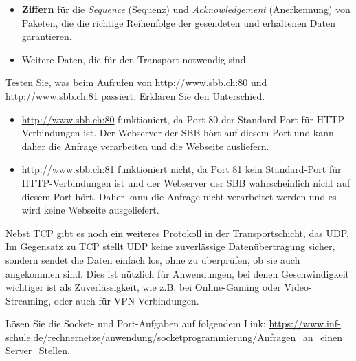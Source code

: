 \begin{itemize}
\begin{table}[H]
		      \caption{Gängige Ports, Anwendungen und deren Verwendung (\gls{DNS} verwendet hauptsächlich \gls{UDP}, die übrigen Anwendungen \gls{TCP})}
		      \label{tab:tcpPorts}
	      \end{table}
	      Sowohl der \textit{Client} wie auch der \textit{Server} versehen die Daten mit jeweils einer Zahl, die für den Ursprungs-Port (\textit{Source Port}), respektive den Ziel-Port (\textit{Destination Port}) stehen.
	\item \textbf{Ziffern} für die \textit{Sequence} (Sequenz) und \textit{Acknowledgement} (Anerkennung) von Paketen, die die richtige Reihenfolge der gesendeten und erhaltenen Daten garantieren.
	\item Weitere Daten, die für den Transport notwendig sind.
\end{itemize}

\begin{myexercise}
	Testen Sie, was beim Aufrufen von \url{http://www.sbb.ch:80} und \url{http://www.sbb.ch:81} passiert. Erklären Sie den Unterschied.
	\begin{myanswer}
		\begin{itemize}
			\item \url{http://www.sbb.ch:80} funktioniert, da Port 80 der Standard-Port für \gls{HTTP}-Verbindungen ist. Der Webserver der SBB hört auf diesem Port und kann daher die Anfrage verarbeiten und die Webseite ausliefern.
			\item \url{http://www.sbb.ch:81} funktioniert nicht, da Port 81 kein Standard-Port für \gls{HTTP}-Verbindungen ist und der Webserver der SBB wahrscheinlich nicht auf diesem Port hört. Daher kann die Anfrage nicht verarbeitet werden und es wird keine Webseite ausgeliefert.
		\end{itemize}
	\end{myanswer}
\end{myexercise}

Nebst \gls{TCP} gibt es noch ein weiteres Protokoll in der Transportschicht, das \gls{UDP}. Im Gegensatz zu \gls{TCP} stellt \gls{UDP} keine zuverlässige Datenübertragung sicher, sondern sendet die Daten einfach los, ohne zu überprüfen, ob sie auch angekommen sind. Dies ist nützlich für Anwendungen, bei denen Geschwindigkeit wichtiger ist als Zuverlässigkeit, wie z.B. bei Online-Gaming oder Video-Streaming, oder auch für \gls{VPN}-Verbindungen.

\begin{mychallenge}
	Lösen Sie die Socket- und Port-Aufgaben auf folgendem Link: \url{https://www.inf-schule.de/rechnernetze/anwendung/socketprogrammierung/Anfragen_an_einen_Server_Stellen}.
\end{mychallenge}

